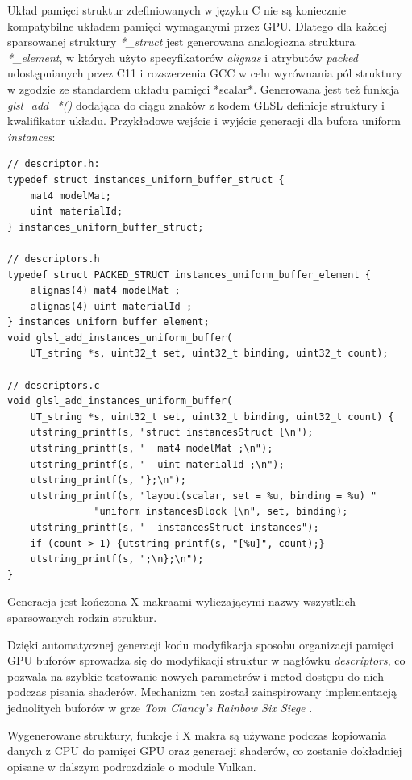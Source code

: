 Układ pamięci struktur zdefiniowanych w języku C nie są koniecznie kompatybilne układem pamięci wymaganymi przez GPU.
Dlatego dla każdej sparsowanej struktury \textit{*\_struct} jest generowana analogiczna struktura \textit{*\_element}, w których użyto specyfikatorów \textit{alignas} i atrybutów \textit{packed} udostępnianych przez C11 i rozszerzenia GCC w celu wyrównania pól struktury w zgodzie ze standardem układu pamięci *scalar*.
Generowana jest też funkcja \textit{glsl\_add\_*()} dodająca do ciągu znaków z kodem GLSL definicje struktury i kwalifikator układu.
Przykładowe wejście i wyjście generacji dla bufora uniform \textit{instances}:
\lstset{language=C}
\begin{lstlisting}[caption={Przykładowe wejście i wyjście generacji dla bufora uniform},captionpos=b]
// descriptor.h:
typedef struct instances_uniform_buffer_struct {
	mat4 modelMat;
	uint materialId;
} instances_uniform_buffer_struct;
	
// descriptors.h
typedef struct PACKED_STRUCT instances_uniform_buffer_element {
	alignas(4) mat4 modelMat ;
	alignas(4) uint materialId ;
} instances_uniform_buffer_element;
void glsl_add_instances_uniform_buffer(
	UT_string *s, uint32_t set, uint32_t binding, uint32_t count);

// descriptors.c
void glsl_add_instances_uniform_buffer(
	UT_string *s, uint32_t set, uint32_t binding, uint32_t count) {
	utstring_printf(s, "struct instancesStruct {\n");
	utstring_printf(s, "  mat4 modelMat ;\n");
	utstring_printf(s, "  uint materialId ;\n");
	utstring_printf(s, "};\n");
	utstring_printf(s, "layout(scalar, set = %u, binding = %u) "
			   "uniform instancesBlock {\n", set, binding);
	utstring_printf(s, "  instancesStruct instances");
	if (count > 1) {utstring_printf(s, "[%u]", count);}
	utstring_printf(s, ";\n};\n");
}
\end{lstlisting}
Generacja jest kończona X makraami wyliczającymi nazwy wszystkich sparsowanych rodzin struktur. 

Dzięki automatycznej generacji kodu modyfikacja sposobu organizacji pamięci GPU buforów sprowadza się do modyfikacji struktur w nagłówku \textit{descriptors}, co pozwala na szybkie testowanie nowych parametrów i metod dostępu do nich podczas pisania shaderów.
Mechanizm ten został zainspirowany implementacją jednolitych buforów w grze \textit{Tom Clancy's Rainbow Six Siege} \cite{RAINBOWSIXSIEGE}.

Wygenerowane struktury, funkcje i X makra są używane podczas kopiowania danych z CPU do pamięci GPU oraz generacji shaderów, co zostanie dokładniej opisane w dalszym podrozdziale o module Vulkan.


